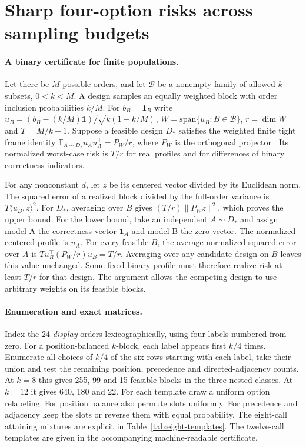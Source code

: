 \section{Sharp four-option risks across sampling budgets}
\label{app:budgets}

\paragraph{A binary certificate for finite populations.}
Let there be $M$ possible orders, and let $\mathcal B$ be a nonempty
family of allowed $k$-subsets, $0<k<M$. A design samples an equally
weighted block with order inclusion probabilities $k/M$. For
$b_B=\mathbf 1_B$ write $u_B=(b_B-(k/M)\mathbf 1)/\sqrt{k(1-k/M)}$,
$W=\mathrm{span}\{u_B:B\in\mathcal B\}$, $r=\dim W$ and $T=M/k-1$.
Suppose a feasible design $D_*$ satisfies the weighted finite tight
frame identity $\mathbb E_{A\sim D_*}u_Au_A^\top=P_W/r$, where
$P_W$ is the orthogonal projector \citep{benedetto2003}. Its normalized
worst-case risk is $T/r$ for real profiles and for differences of
binary correctness indicators.

For any nonconstant $d$, let $z$ be its centered vector divided by its
Euclidean norm. The squared error of a realized block divided by
the full-order variance is $T\langle u_B,z\rangle^2$. For $D_*$,
averaging over $B$ gives $(T/r)\|P_Wz\|^2$, which proves the upper
bound. For the lower bound, take an independent $A\sim D_*$ and
assign model A the correctness vector $\mathbf 1_A$ and model B the
zero vector. The normalized centered profile is $u_A$. For every
feasible $B$, the average normalized squared error over $A$ is
$T u_B^\top(P_W/r)u_B=T/r$. Averaging over any candidate design on
$B$ leaves this value unchanged. Some fixed binary profile must
therefore realize risk at least $T/r$ for that design. The argument
allows the competing design to use arbitrary weights on its feasible blocks.

\paragraph{Enumeration and exact matrices.}
Index the 24 \emph{display} orders lexicographically, using four labels
numbered from zero. For a position-balanced $k$-block, each label
appears first $k/4$ times. Enumerate all choices of $k/4$ of the six
rows starting with each label, take their union and test the remaining
position, precedence and directed-adjacency counts. At $k=8$ this
gives 255, 99 and 15 feasible blocks in the three nested classes. At
$k=12$ it gives 640, 180 and 22. For each template draw a uniform
option relabeling. For position balance also permute slots uniformly.
For precedence and adjacency keep the slots or reverse them with equal
probability. The eight-call attaining mixtures are explicit in
Table~\ref{tab:eight-templates}. The twelve-call templates are given
in the accompanying machine-readable certificate.

